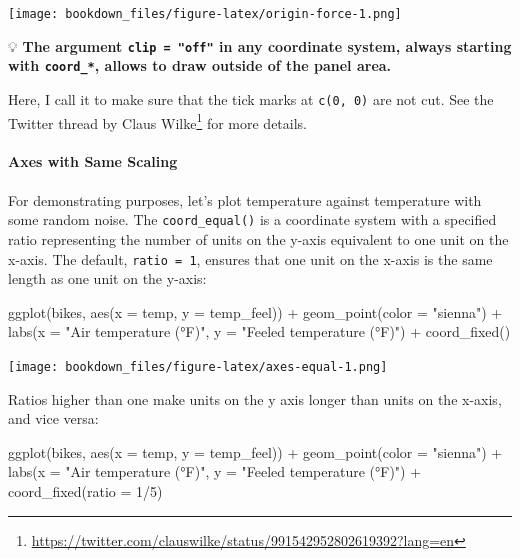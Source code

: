 \documentclass[
]{krantz}
\makeatletter
\newenvironment{Shaded}{\begin{snugshade}}{\end{snugshade}}
\newcommand{\AttributeTok}[1]{\textcolor[rgb]{0.61,0.61,0.61}{#1}}
\newcommand{\DecValTok}[1]{\textcolor[rgb]{0.06,0.06,0.06}{#1}}
\newcommand{\FunctionTok}[1]{\textcolor[rgb]{0,0,0}{#1}}
\newcommand{\NormalTok}[1]{#1}
\newcommand{\SpecialCharTok}[1]{\textcolor[rgb]{0,0,0}{#1}}
\newcommand{\StringTok}[1]{\textcolor[rgb]{0.5,0.5,0.5}{#1}}
\renewcommand{\href}[2]{#2\footnote{\url{#1}}}
\newenvironment{kframe}{%
\medskip{}
\setlength{\fboxsep}{.8em}
 \def\at@end@of@kframe{}%
 \ifinner\ifhmode%
  \def\at@end@of@kframe{\end{minipage}}%
  \begin{minipage}{\columnwidth}%
 \fi\fi%
 \def\FrameCommand##1{\hskip\@totalleftmargin \hskip-\fboxsep
 \colorbox{shadecolor}{##1}\hskip-\fboxsep
     \hskip-\linewidth \hskip-\@totalleftmargin \hskip\columnwidth}%
 \MakeFramed {\advance\hsize-\width
   \@totalleftmargin\z@ \linewidth\hsize
   \@setminipage}}%
 {\par\unskip\endMakeFramed%
 \at@end@of@kframe}
\renewenvironment{Shaded}{\begin{kframe}}{\end{kframe}}
\makeatother
\begin{document}
\texttt{[image: bookdown\_files/figure-latex/origin-force-1.png]}

💡 \textbf{The argument \texttt{clip\ =\ "off"} in any coordinate system, always starting with \texttt{coord\_*}, allows to draw outside of the panel area.}

Here, I call it to make sure that the tick marks at \texttt{c(0,\ 0)} are not cut. See the \href{https://twitter.com/clauswilke/status/991542952802619392?lang=en}{Twitter thread by Claus Wilke} for more details.

\hypertarget{axes-with-same-scaling}{%
\paragraph{Axes with Same Scaling}\label{axes-with-same-scaling}}

For demonstrating purposes, let's plot temperature against temperature with some random noise. The \texttt{coord\_equal()} is a coordinate system with a specified ratio representing the number of units on the y-axis equivalent to one unit on the x-axis. The default, \texttt{ratio\ =\ 1}, ensures that one unit on the x-axis is the same length as one unit on the y-axis:

\begin{Shaded}
\begin{Highlighting}[]
\FunctionTok{ggplot}\NormalTok{(bikes, }\FunctionTok{aes}\NormalTok{(}\AttributeTok{x =}\NormalTok{ temp, }\AttributeTok{y =}\NormalTok{ temp\_feel)) }\SpecialCharTok{+}
  \FunctionTok{geom\_point}\NormalTok{(}\AttributeTok{color =} \StringTok{"sienna"}\NormalTok{) }\SpecialCharTok{+}
  \FunctionTok{labs}\NormalTok{(}\AttributeTok{x =} \StringTok{"Air temperature (°F)"}\NormalTok{, }\AttributeTok{y =} \StringTok{"Feeled temperature (°F)"}\NormalTok{) }\SpecialCharTok{+}
  \FunctionTok{coord\_fixed}\NormalTok{()}
\end{Highlighting}
\end{Shaded}

\texttt{[image: bookdown\_files/figure-latex/axes-equal-1.png]}

Ratios higher than one make units on the y axis longer than units on the x-axis, and vice versa:

\begin{Shaded}
\begin{Highlighting}[]
\FunctionTok{ggplot}\NormalTok{(bikes, }\FunctionTok{aes}\NormalTok{(}\AttributeTok{x =}\NormalTok{ temp, }\AttributeTok{y =}\NormalTok{ temp\_feel)) }\SpecialCharTok{+}
  \FunctionTok{geom\_point}\NormalTok{(}\AttributeTok{color =} \StringTok{"sienna"}\NormalTok{) }\SpecialCharTok{+}
  \FunctionTok{labs}\NormalTok{(}\AttributeTok{x =} \StringTok{"Air temperature (°F)"}\NormalTok{, }\AttributeTok{y =} \StringTok{"Feeled temperature (°F)"}\NormalTok{) }\SpecialCharTok{+}
  \FunctionTok{coord\_fixed}\NormalTok{(}\AttributeTok{ratio =} \DecValTok{1}\SpecialCharTok{/}\DecValTok{5}\NormalTok{)}
\end{Highlighting}
\end{Shaded}
\end{document}
